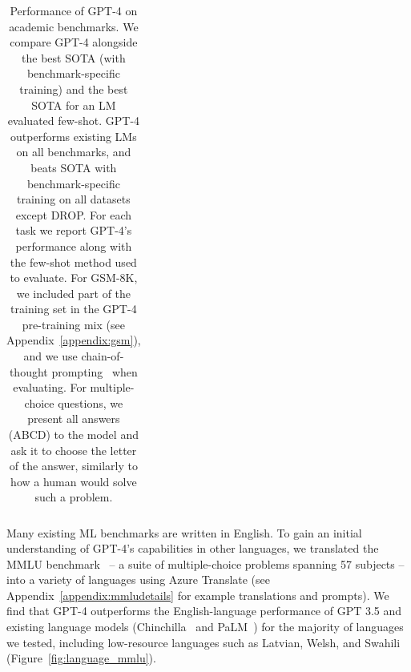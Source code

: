 \documentclass{article}
\begin{document}
\begin{table}[htbp]
\begin{tabular}[]{>{\centering\arraybackslash}p{3.5cm} | >{\centering\arraybackslash}p{1.8cm}>{\centering\arraybackslash}p{1.8cm}>{\centering\arraybackslash}p{2cm}>{\centering\arraybackslash}p{2.8cm}}
\bottomrule
\end{tabular}
\caption{Performance of GPT-4 on academic benchmarks. We compare GPT-4 alongside the best SOTA (with benchmark-specific training) and the best SOTA for an LM evaluated few-shot. GPT-4 outperforms existing LMs on all benchmarks, and beats SOTA with benchmark-specific training on all datasets except DROP. For each task we report GPT-4's performance along with the few-shot method used to evaluate. For GSM-8K, we included part of the training set in the GPT-4 pre-training mix (see Appendix~\ref{appendix:gsm}), and we use chain-of-thought prompting~\citep{wei2022chain} when evaluating. For multiple-choice questions, we present all answers (ABCD) to the model and ask it to choose the letter of the answer, similarly to how a human would solve such a problem.}
\label{table:academic_evals}
\end{table}




Many existing ML benchmarks are written in English. To gain an initial understanding of GPT-4's capabilities in other languages, we translated the MMLU benchmark~\citep{hendryckstest2021,hendrycks2021ethics} -- a suite of multiple-choice problems spanning 57 subjects -- into a variety of languages using Azure Translate (see Appendix~\ref{appendix:mmludetails} for example translations and prompts). We find that GPT-4 outperforms the English-language performance of GPT 3.5 and
existing language models (Chinchilla~\citep{hoffmann2022training} and PaLM~\citep{chowdhery2022palm}) for the majority of languages we
tested, including low-resource languages such as Latvian, Welsh, and Swahili (Figure~\ref{fig:language_mmlu}).
\end{document}
